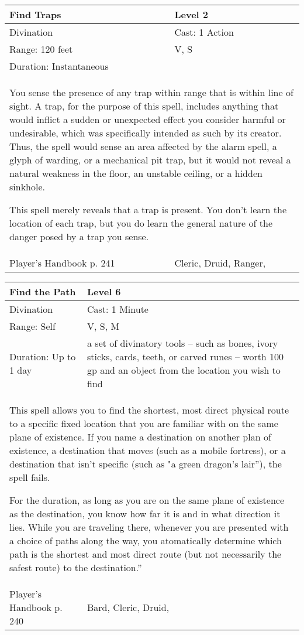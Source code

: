 \documentclass[11pt]{report}
\begin{document}
\begin{table}[H]
	\begin{tabular}{||p{6cm}|p{6cm}||}
		\hline\hline
		\bf{Find Traps} & Level 2\\ \hline
		Divination & Cast: 1 Action\\ \hline
		Range: 120 feet & V, S\\ \hline
		Duration: Instantaneous & \\ \hline
		\multicolumn{2}{||p{12cm}||}{You sense the presence of any trap within range that is within line of sight.
A trap, for the purpose of this spell, includes anything that would inflict a sudden or unexpected effect you consider harmful or undesirable, which was specifically intended as such by its creator. Thus, the spell would sense an area affected by the alarm spell, a glyph of warding, or a mechanical pit trap, but it would not reveal a natural weakness in the floor, an unstable ceiling, or a hidden sinkhole.

This spell merely reveals that a trap is present. You don’t learn the location of each trap, but you do learn the general nature of the danger posed by a trap you sense.}\\ \hline
Player's Handbook p. 241 & Cleric, Druid, Ranger, \\ \hline\hline
	\end{tabular}
\end{table}

\begin{table}[H]
	\begin{tabular}{||p{6cm}|p{6cm}||}
		\hline\hline
		\bf{Find the Path} & Level 6\\ \hline
		Divination & Cast: 1 Minute\\ \hline
		Range: Self & V, S, M\\ \hline
		Duration: Up to 1 day & a set of divinatory tools – such as bones, ivory sticks, cards, teeth, or carved runes – worth 100 gp and an object from the location you wish to find\\ \hline
		\multicolumn{2}{||p{12cm}||}{This spell allows you to find the shortest, most direct physical route to a specific fixed location that you are familiar with on the same plane of existence. If you name a destination on another plan of existence, a destination that moves (such as a mobile fortress), or a destination that isn’t specific (such as "a green dragon’s lair”), the spell fails.

For the duration, as long as you are on the same plane of existence as the destination, you know how far it is and in what direction it lies. While you are traveling there, whenever you are presented with a choice of paths along the way, you atomatically determine which path is the shortest and most direct route (but not necessarily the safest route) to the destination.”}\\ \hline
Player's Handbook p. 240 & Bard, Cleric, Druid, \\ \hline\hline
	\end{tabular}
\end{table}
\end{document}
